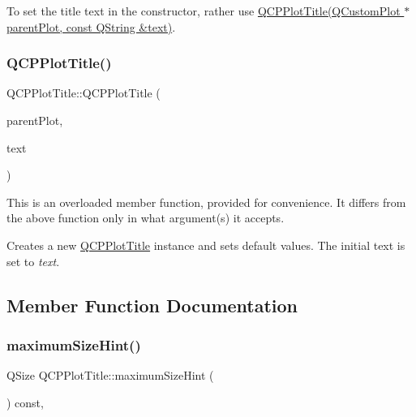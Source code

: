 To set the title text in the constructor, rather use \hyperlink{class_q_c_p_plot_title_a90b9f46ceccbeee41f71c895a8c7ee1f}{Q\+C\+P\+Plot\+Title(\+Q\+Custom\+Plot $\ast$parent\+Plot, const Q\+String \&text)}. \hypertarget{class_q_c_p_plot_title_a90b9f46ceccbeee41f71c895a8c7ee1f}{}\label{class_q_c_p_plot_title_a90b9f46ceccbeee41f71c895a8c7ee1f} 
\subsubsection{\texorpdfstring{Q\+C\+P\+Plot\+Title()}{QCPPlotTitle()}\hspace{0.1cm}{\footnotesize\ttfamily [2/2]}}
{\footnotesize\ttfamily Q\+C\+P\+Plot\+Title\+::\+Q\+C\+P\+Plot\+Title (\begin{DoxyParamCaption}\item[{\hyperlink{class_q_custom_plot}{Q\+Custom\+Plot} $\ast$}]{parent\+Plot,  }\item[{const Q\+String \&}]{text }\end{DoxyParamCaption})\hspace{0.3cm}{\ttfamily [explicit]}}

This is an overloaded member function, provided for convenience. It differs from the above function only in what argument(s) it accepts.

Creates a new \hyperlink{class_q_c_p_plot_title}{Q\+C\+P\+Plot\+Title} instance and sets default values. The initial text is set to {\itshape text}. 

\subsection{Member Function Documentation}
\hypertarget{class_q_c_p_plot_title_ae24c395b5d3be64b42dcb9e27ed023c4}{}\label{class_q_c_p_plot_title_ae24c395b5d3be64b42dcb9e27ed023c4} 
\subsubsection{\texorpdfstring{maximum\+Size\+Hint()}{maximumSizeHint()}}
{\footnotesize\ttfamily Q\+Size Q\+C\+P\+Plot\+Title\+::maximum\+Size\+Hint (\begin{DoxyParamCaption}{ }\end{DoxyParamCaption}) const\hspace{0.3cm}{\ttfamily [protected]}, {\ttfamily [virtual]}}

